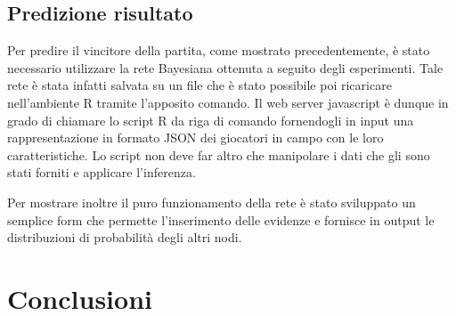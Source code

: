\documentclass[hidelinks, 12pt]{article}
\begin{document}
	
	\subsection{Predizione risultato}
	
	Per predire il vincitore della partita, come mostrato precedentemente, è stato necessario utilizzare la rete Bayesiana ottenuta a seguito degli esperimenti. Tale rete è stata infatti salvata su un file che è stato possibile poi ricaricare nell'ambiente R tramite l'apposito comando. Il web server javascript è dunque in grado di chiamare lo script R da riga di comando fornendogli in input una rappresentazione in formato JSON dei giocatori in campo con le loro caratteristiche. Lo script non deve far altro che manipolare i dati che gli sono stati forniti e applicare l'inferenza.
	
	Per mostrare inoltre il puro funzionamento della rete è stato sviluppato un semplice form che permette l'inserimento delle evidenze e fornisce in output le distribuzioni di probabilità degli altri nodi.
	
	
	\clearpage
	\section{Conclusioni}
	
	\newpage
	
	
	
\end{document}
